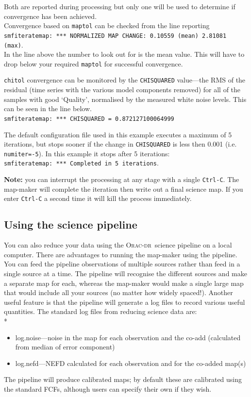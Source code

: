 \documentclass[twoside,11pt]{article}
\newcommand{\htmladdnormallink}[2]{#1}
\newcommand{\xlabel}[1]{}
\renewcommand{\_}{\texttt{\symbol{95}}}
\newcommand{\oracdr}{\htmladdnormallink{\textsc{Orac-dr}}{http://www.oracdr.org/oracdr}}
\begin{document}
Both are reported during processing but only one will be used to determine
if convergence has been achieved.
\\
Convergence based on \texttt{maptol} can be checked from the line
reporting\\
\hspace{5mm}\texttt{smf\_iteratemap: *** NORMALIZED MAP
CHANGE: 0.10559 (mean) 2.81081 (max)}.\\
In the line above the number to look out for is the mean value. This
will have to drop below your required \texttt{maptol} for successful
convergence.

\texttt{chitol} convergence can be monitored by the
\texttt{CHISQUARED} value---the RMS of the residual (time series with
the various model components removed) for all of the samples with good
`Quality', normalised by the measured white noise levels. This can be
seen in the line below.\\
\hspace{0.5cm}\texttt{smf\_iteratemap: *** CHISQUARED = 0.872127100064999}


The default configuration file used in this example executes a maximum
of 5 iterations, but stops sooner if the change in \texttt{CHISQUARED}
is less then 0.001 (i.e. \texttt{numiter=-5}). In this example it
stops after 5 iterations: \\
\texttt{smf\_iteratemap: *** Completed in 5 iterations}.


\textbf{Note:} you can interrupt the processing at any stage with a
single \texttt{Ctrl-C}. The map-maker will complete the iteration then write
out a final science map. If you enter \texttt{Ctrl-C} a second time it will
kill the process immediately.

\subsection{\xlabel{sciencepl}Using the science pipeline}

You can also reduce your data using the \oracdr\ science pipeline on a
local computer. There are advantages to running the map-maker using
the pipeline. You can feed the pipeline observations of multiple
sources rather than feed in a single source at a time. The pipeline
will recognise the different sources and make a separate map for each,
whereas the map-maker would make a single large map that would include
all your sources (no matter how widely spaced!). Another useful
feature is that the pipeline will generate a log files to record
various useful quantities. The standard log files from reducing
science data are:
\\*
\begin{itemize}
\item log.noise---noise in the map for each observation and the co-add
(calculated from median of error component)
\item log.nefd---NEFD calculated for each observation and for the co-added map(s)
\end{itemize}
The pipeline will produce calibrated maps; by default these are
calibrated using the standard FCFs, although users can specify their
own if they wish.
\end{document}
